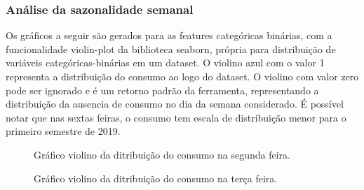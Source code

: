 \documentclass[	12pt, Times, openright, twoside, a4paper, english, brazil]{abntex2}
\begin{document}
    	    \subsubsection{Análise da sazonalidade semanal}
    	        Os gráficos a seguir são gerados para as features categóricas binárias, com a funcionalidade violin-plot da biblioteca seaborn, própria para distribuição de variáveis categóricas-binárias em um dataset.
    	        O violino azul com o valor 1 representa a distribuição do consumo ao logo do dataset.
    	        O violino com valor zero pode ser ignorado e é um retorno padrão da ferramenta, representando a distribuição da ausencia de consumo no dia da semana considerado.
    	        É possível notar que nas sextas feiras, o consumo tem escala de distribuição menor para o primeiro semestre de 2019.
    	         \begin{figure}[!ht]
                	\caption{Gráfico violino da ditribuição do consumo na segunda feira. \label{fig:case1_violinplot_segunda} }
                \end{figure}
                
                \begin{figure}[!ht]
                	\caption{Gráfico violino da ditribuição do consumo na terça feira. \label{fig:case1_violinplot_terca} }
                \end{figure}
                
\end{document}

